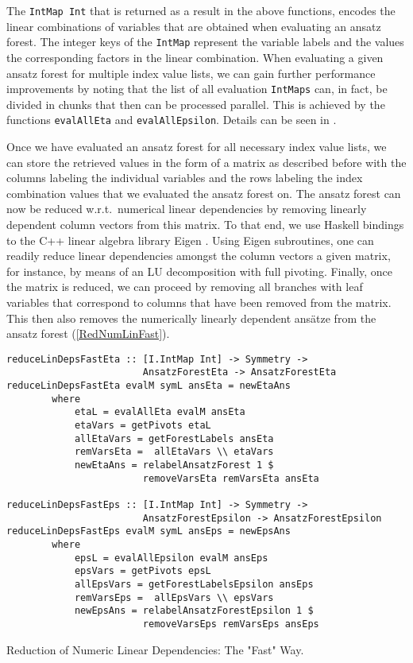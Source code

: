 The \texttt{IntMap Int} that is returned as a result in the above functions, encodes the linear combinations of variables that are obtained when evaluating an ansatz forest. The integer keys of the \texttt{IntMap} represent the variable labels and the values the corresponding factors in the linear combination. 
When evaluating a given ansatz forest for multiple index value lists, we can gain further performance improvements by noting that the list of all evaluation \texttt{IntMaps} can, in fact, be divided in chunks that then can be processed parallel. This is achieved by the functions \texttt{evalAllEta} and \texttt{evalAllEpsilon}. Details can be seen in \cite{sparse-tensor}.

Once we have evaluated an ansatz forest for all necessary index value lists, we can store the retrieved values in the form of a matrix as described before with the columns labeling the individual variables and the rows labeling the index combination values that we evaluated the ansatz forest on. The ansatz forest can now be reduced w.r.t.\ numerical linear dependencies by removing linearly dependent column vectors from this matrix. To that end, we use Haskell bindings \cite{HackageEigen} to the C++ linear algebra library Eigen \cite{eigenweb}. Using Eigen subroutines, one can readily reduce linear dependencies amongst the column vectors a given matrix, for instance, by means of an LU decomposition with full pivoting. Finally, once the matrix is reduced, we can proceed by removing all branches with leaf variables that correspond to columns that have been removed from the matrix. This then also removes the numerically linearly dependent ansätze from the ansatz forest (\ref{RedNumLinFast}).
\begin{listing}[hbt!]
\begin{verbatim}
reduceLinDepsFastEta :: [I.IntMap Int] -> Symmetry ->
                        AnsatzForestEta -> AnsatzForestEta
reduceLinDepsFastEta evalM symL ansEta = newEtaAns
        where
            etaL = evalAllEta evalM ansEta
            etaVars = getPivots etaL
            allEtaVars = getForestLabels ansEta
            remVarsEta =  allEtaVars \\ etaVars
            newEtaAns = relabelAnsatzForest 1 $
                        removeVarsEta remVarsEta ansEta

reduceLinDepsFastEps :: [I.IntMap Int] -> Symmetry ->
                        AnsatzForestEpsilon -> AnsatzForestEpsilon
reduceLinDepsFastEps evalM symL ansEps = newEpsAns
        where
            epsL = evalAllEpsilon evalM ansEps
            epsVars = getPivots epsL
            allEpsVars = getForestLabelsEpsilon ansEps
            remVarsEps =  allEpsVars \\ epsVars
            newEpsAns = relabelAnsatzForestEpsilon 1 $
                        removeVarsEps remVarsEps ansEps 
\end{verbatim} 
\caption{Reduction of Numeric Linear Dependencies: The "Fast" Way.}\label{RedNumLinFast}
\end{listing}

